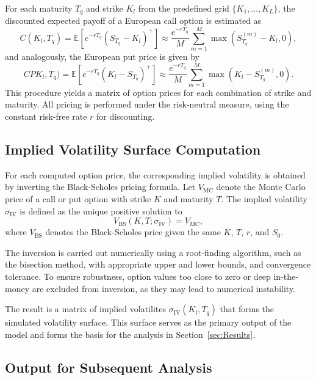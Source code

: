 For each maturity $T_q$ and strike $K_l$ from the predefined grid $\{K_1,\ldots,K_L\}$, the discounted expected payoff of a European call option is estimated as
\begin{equation}
    C(K_l, T_q) = \mathbb{E}\left[ e^{-rT_q} (S_{T_q} - K_l)^+ \right] \approx \frac{e^{-rT_q}}{M} \sum_{m=1}^M \max\left(S_{T_q}^{(m)} - K_l, 0\right),
\end{equation}
and analogously, the European put price is given by
\begin{equation}
    CPK_l, T_q) = \mathbb{E}\left[ e^{-rT_q} (K_l - S_{T_q})^+ \right] \approx \frac{e^{-rT_q}}{M} \sum_{m=1}^M \max\left(K_l - S_{T_q}^{(m)}, 0\right).
\end{equation}
This procedure yields a matrix of option prices for each combination of strike and maturity. All pricing is performed under the risk-neutral measure, using the constant risk-free rate $r$ for discounting.


\subsection{Implied Volatility Surface Computation} \label{subsec:ImpliedVolatilitySurfaceComputation}

For each computed option price, the corresponding implied volatility is obtained by inverting the Black-Scholes pricing formula. Let $V_{\text{MC}}$ denote the Monte Carlo price of a call or put option with strike $K$ and maturity $T$. The implied volatility $\sigma_{\text{IV}}$ is defined as the unique positive solution to
\begin{equation}
    V_{\text{BS}}(K, T; \sigma_{\text{IV}}) = V_{\text{MC}},
\end{equation}
where $V_{\text{BS}}$ denotes the Black-Scholes price given the same $K$, $T$, $r$, and $S_0$.

The inversion is carried out numerically using a root-finding algorithm, such as the bisection method, with appropriate upper and lower bounds, and convergence tolerance. To ensure robustness, option values too close to zero or deep in-the-money are excluded from inversion, as they may lead to numerical instability.

The result is a matrix of implied volatilites $\sigma_{\text{IV}}(K_l,T_q)$ that forms the simulated volatility surface. This surface serves as the primary output of the model and forms the basis for the analysis in Section~\ref{sec:Results}.


\subsection{Output for Subsequent Analysis} \label{subsec:SimulationOutput}

